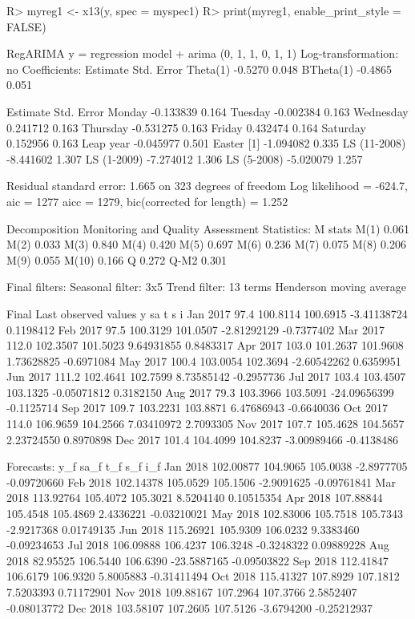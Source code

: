 \documentclass[article]{jss}
\begin{document}
\begin{CodeChunk}
\begin{CodeInput}
R> myreg1 <- x13(y, spec = myspec1)
R> print(myreg1, enable_print_style = FALSE)
\end{CodeInput}

\begin{CodeOutput}


RegARIMA
y = regression model + arima (0, 1, 1, 0, 1, 1)
Log-transformation: no
Coefficients:
          Estimate Std. Error
Theta(1)   -0.5270      0.048
BTheta(1)  -0.4865      0.051

              Estimate Std. Error
Monday       -0.133839      0.164
Tuesday      -0.002384      0.163
Wednesday     0.241712      0.163
Thursday     -0.531275      0.163
Friday        0.432474      0.164
Saturday      0.152956      0.163
Leap year    -0.045977      0.501
Easter [1]   -1.094082      0.335
LS (11-2008) -8.441602      1.307
LS (1-2009)  -7.274012      1.306
LS (5-2008)  -5.020079      1.257


Residual standard error: 1.665 on 323 degrees of freedom
Log likelihood = -624.7, aic =  1277 aicc =  1279, bic(corrected for length) = 1.252



Decomposition
Monitoring and Quality Assessment Statistics: 
      M stats
M(1)    0.061
M(2)    0.033
M(3)    0.840
M(4)    0.420
M(5)    0.697
M(6)    0.236
M(7)    0.075
M(8)    0.206
M(9)    0.055
M(10)   0.166
Q       0.272
Q-M2    0.301

Final filters: 
Seasonal filter:  3x5
Trend filter:  13 terms Henderson moving average


Final
Last observed values
             y       sa        t            s          i
Jan 2017  97.4 100.8114 100.6915  -3.41138724  0.1198412
Feb 2017  97.5 100.3129 101.0507  -2.81292129 -0.7377402
Mar 2017 112.0 102.3507 101.5023   9.64931855  0.8483317
Apr 2017 103.0 101.2637 101.9608   1.73628825 -0.6971084
May 2017 100.4 103.0054 102.3694  -2.60542262  0.6359951
Jun 2017 111.2 102.4641 102.7599   8.73585142 -0.2957736
Jul 2017 103.4 103.4507 103.1325  -0.05071812  0.3182150
Aug 2017  79.3 103.3966 103.5091 -24.09656399 -0.1125714
Sep 2017 109.7 103.2231 103.8871   6.47686943 -0.6640036
Oct 2017 114.0 106.9659 104.2566   7.03410972  2.7093305
Nov 2017 107.7 105.4628 104.5657   2.23724550  0.8970898
Dec 2017 101.4 104.4099 104.8237  -3.00989466 -0.4138486

Forecasts:
               y_f     sa_f      t_f         s_f         i_f
Jan 2018 102.00877 104.9065 105.0038  -2.8977705 -0.09720660
Feb 2018 102.14378 105.0529 105.1506  -2.9091625 -0.09761841
Mar 2018 113.92764 105.4072 105.3021   8.5204140  0.10515354
Apr 2018 107.88844 105.4548 105.4869   2.4336221 -0.03210021
May 2018 102.83006 105.7518 105.7343  -2.9217368  0.01749135
Jun 2018 115.26921 105.9309 106.0232   9.3383460 -0.09234653
Jul 2018 106.09888 106.4237 106.3248  -0.3248322  0.09889228
Aug 2018  82.95525 106.5440 106.6390 -23.5887165 -0.09503822
Sep 2018 112.41847 106.6179 106.9320   5.8005883 -0.31411494
Oct 2018 115.41327 107.8929 107.1812   7.5203393  0.71172901
Nov 2018 109.88167 107.2964 107.3766   2.5852407 -0.08013772
Dec 2018 103.58107 107.2605 107.5126  -3.6794200 -0.25212937



\end{CodeOutput}
\end{CodeChunk}
\end{document}
